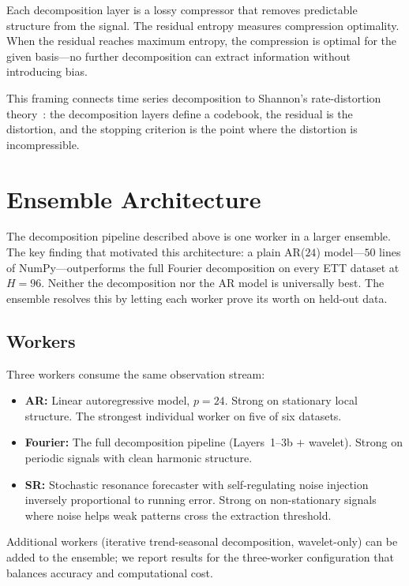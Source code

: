 \documentclass[sigconf,nonacm]{acmart}
\begin{document}
Each decomposition layer is a lossy compressor that removes predictable structure from the signal. The residual entropy measures compression optimality. When the residual reaches maximum entropy, the compression is optimal for the given basis---no further decomposition can extract information without introducing bias.

This framing connects time series decomposition to Shannon's rate-distortion theory~\cite{shannon1959}: the decomposition layers define a codebook, the residual is the distortion, and the stopping criterion is the point where the distortion is incompressible.

\section{Ensemble Architecture}

The decomposition pipeline described above is one worker in a larger ensemble. The key finding that motivated this architecture: a plain AR($24$) model---$50$ lines of NumPy---outperforms the full Fourier decomposition on every ETT dataset at $H=96$. Neither the decomposition nor the AR model is universally best. The ensemble resolves this by letting each worker prove its worth on held-out data.

\subsection{Workers}

Three workers consume the same observation stream:
\begin{itemize}
\item \textbf{AR:} Linear autoregressive model, $p=24$. Strong on stationary local structure. The strongest individual worker on five of six datasets.
\item \textbf{Fourier:} The full decomposition pipeline (Layers~1--3b $+$ wavelet). Strong on periodic signals with clean harmonic structure.
\item \textbf{SR:} Stochastic resonance forecaster with self-regulating noise injection inversely proportional to running error. Strong on non-stationary signals where noise helps weak patterns cross the extraction threshold.
\end{itemize}

Additional workers (iterative trend-seasonal decomposition, wavelet-only) can be added to the ensemble; we report results for the three-worker configuration that balances accuracy and computational cost.
\end{document}
